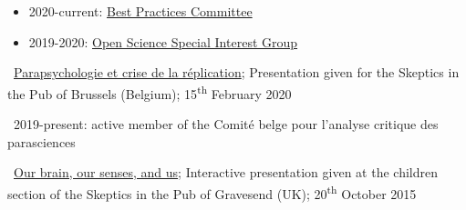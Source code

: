 

\begin{itemize}
    \item 2020-current: \href{https://www.humanbrainmapping.org/i4a/pages/index.cfm?pageid=4027}{Best Practices Committee}
    \item 2019-2020: \href{https://www.humanbrainmapping.org/i4a/pages/index.cfm?pageID=3712}{Open Science Special Interest Group} 
\end{itemize}






\textbullet~\href{https://osf.io/wm3r6/}{Parapsychologie et crise de la réplication}; 
Presentation given for the Skeptics in the Pub of Brussels (Belgium); 
15\textsuperscript{th} February 2020


\textbullet~2019-present: active member of the Comité belge pour l'analyse critique des parasciences

\textbullet~\href{https://osf.io/5a8e9/}{Our brain, our senses, and us}; 
Interactive presentation given at the children section 
of the Skeptics in the Pub of Gravesend (UK); 20\textsuperscript{th} October 2015
